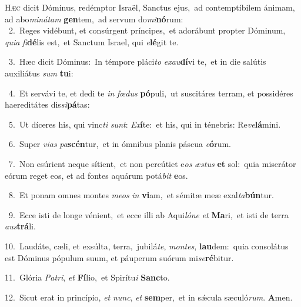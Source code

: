 \lettrine{\initial\textcolor{\initialcolor}{H}}{æc} dicit Dóminus, redémptor Israël, Sanctus ejus,~\dagger ad contemptíbilem ánimam, ad abo\-\textit{mi}\-\textit{ná}\textit{tam} \textbf{gen}\-tem,~\star ad servum do\-\textit{mi}\-\textbf{nó}rum:\\
{\numbfont\textcolor{\numbcolor}{~2.}}~Reges vidébunt, et consúrgent príncipes,~\dagger et adorábunt propter Dóminum, \textit{qui}\-\textit{a} \textit{fi}\-\textbf{dé}lis est,~\star et Sanctum Israel, qui \textit{e}\-\textbf{lé}git te.\par
{\numbfont\textcolor{\numbcolor}{~3.}}~Hæc dicit Dóminus:~\dagger In témpore pláci\textit{to} \textit{ex}\-\textit{au}\textbf{dí}vi te,~\star et in die salútis auxiliátus \textit{sum} \textbf{tu}\-i:\par
{\numbfont\textcolor{\numbcolor}{~4.}}~Et servávi te, et dedi te \textit{in} \textit{fœ}\-\textit{dus} \textbf{pó}\-puli,~\star ut suscitáres terram, et possidéres haereditátes dis\-\textit{si}\-\textbf{pá}tas:\par
{\numbfont\textcolor{\numbcolor}{~5.}}~Ut díceres his, qui vinc\textit{ti} \textit{sunt}\-: \textit{Ex}\-\textbf{í}te:~\star et his, qui in ténebris: Re\-\textit{ve}\-\textbf{lá}mini.\par
{\numbfont\textcolor{\numbcolor}{~6.}}~Super \textit{vi}\-\textit{as} \textit{pa}\-\textbf{scén}tur,~\star et in ómnibus planis páscua \textit{e}\-\textbf{ó}rum.\par
{\numbfont\textcolor{\numbcolor}{~7.}}~Non esúrient neque sítient,~\dagger et non percútiet e\textit{os} \textit{æs}\-\textit{tus} \textbf{et} sol:~\star quia miserátor eórum reget eos, et ad fontes aquárum potá\textit{bit} \textbf{e}\-os.\par
{\numbfont\textcolor{\numbcolor}{~8.}}~Et ponam omnes montes \textit{me}\-\textit{os} \textit{in} \textbf{vi}\-am,~\star et sémitæ meæ exal\-\textit{ta}\-\textbf{bún}tur.\par
{\numbfont\textcolor{\numbcolor}{~9.}}~Ecce isti de longe vénient,~\dagger et ecce illi ab Aqui\-\textit{ló}\-\textit{ne} \textit{et} \textbf{Ma}\-ri,~\star et isti de terra \textit{aus}\-\textbf{trá}li.\par
{\numbfont\textcolor{\numbcolor}{10.}}~Laudáte, cæli, et exsúlta, terra,~\dagger jubilá\-\textit{te}\-, \textit{mon}\-\textit{tes}, \textbf{lau}\-dem:~\star quia consolátus est Dóminus pópulum suum, et páuperum suórum mi\-\textit{se}\-\textbf{ré}bitur.\par
{\numbfont\textcolor{\numbcolor}{11.}}~Glória \textit{Pa}\-\textit{tri}, \textit{et} \textbf{Fí}\-lio,~\star et Spirítu\textit{i} \textbf{Sanc}\-to.\par
{\numbfont\textcolor{\numbcolor}{12.}}~Sicut erat in princípio, \textit{et} \textit{nunc}\-, \textit{et} \textbf{sem}\-per,~\star et in sǽcula sæculó\-\textit{rum}\-. \textbf{A}\-men.\par
